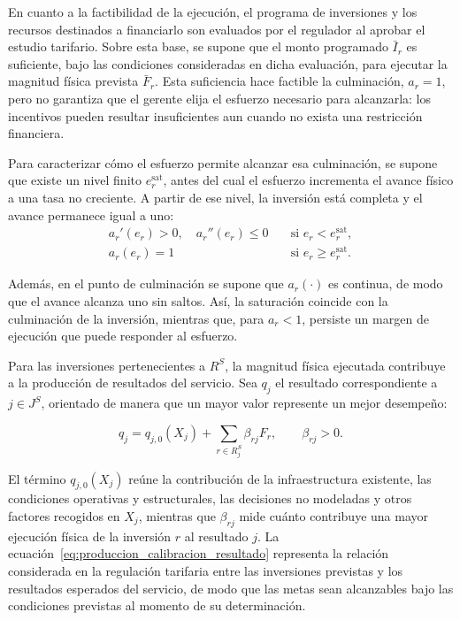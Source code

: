 En cuanto a la factibilidad de la ejecución, el programa de inversiones y los recursos destinados a financiarlo son evaluados por el regulador al aprobar el estudio tarifario. Sobre esta base, se supone que el monto programado \(\bar I_r\) es suficiente, bajo las condiciones consideradas en dicha evaluación, para ejecutar la magnitud física prevista \(\bar F_r\). Esta suficiencia hace factible la culminación, \(a_r=1\), pero no garantiza que el gerente elija el esfuerzo necesario para alcanzarla: los incentivos pueden resultar insuficientes aun cuando no exista una restricción financiera.

Para caracterizar cómo el esfuerzo permite alcanzar esa culminación, se supone que existe un nivel finito \(e_r^{\mathrm{sat}}\), antes del cual el esfuerzo incrementa el avance físico a una tasa no creciente. A partir de ese nivel, la inversión está completa y el avance permanece igual a uno:
\begin{equation}
\label{eq:saturacion_probabilidad}
\begin{aligned}
a_r'(e_r)>0,\quad a_r''(e_r)\leq0
&\quad \text{si } e_r<e_r^{\mathrm{sat}},\\
a_r(e_r)=1
&\quad \text{si } e_r\geq e_r^{\mathrm{sat}}.
\end{aligned}
\end{equation}

Además, en el punto de culminación se supone que \(a_r(\cdot)\) es continua, de modo que el avance alcanza uno sin saltos. Así, la saturación coincide con la culminación de la inversión, mientras que, para \(a_r<1\), persiste un margen de ejecución que puede responder al esfuerzo.

Para las inversiones pertenecientes a \(R^{S}\), la magnitud física ejecutada contribuye a la producción de resultados del servicio. Sea \(q_j\) el resultado correspondiente a \(j\in J^{S}\), orientado de manera que un mayor valor represente un mejor desempeño:

\begin{equation}
\label{eq:produccion_calibracion_resultado}
q_j
=
q_{j,0}(X_j)
+
\sum_{r\in R_j^{S}}
\beta_{rj}F_r,
\qquad
\beta_{rj}>0.
\end{equation}

El término \(q_{j,0}(X_j)\) reúne la contribución de la infraestructura existente, las condiciones operativas y estructurales, las decisiones no modeladas y otros factores recogidos en \(X_j\), mientras que \(\beta_{rj}\) mide cuánto contribuye una mayor ejecución física de la inversión \(r\) al resultado \(j\). La ecuación~\eqref{eq:produccion_calibracion_resultado} representa la relación considerada en la regulación tarifaria entre las inversiones previstas y los resultados esperados del servicio, de modo que las metas sean alcanzables bajo las condiciones previstas al momento de su determinación.

